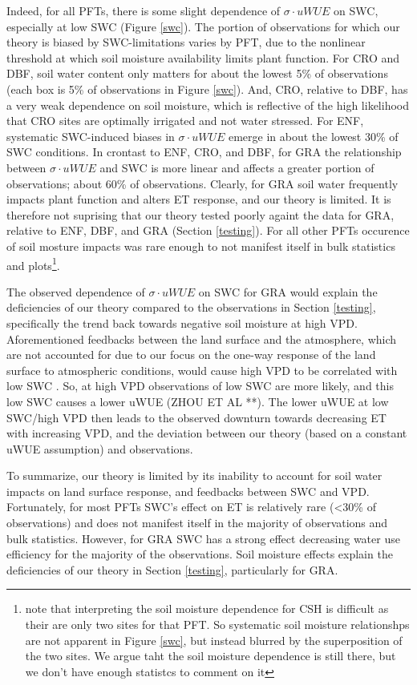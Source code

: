 \documentclass[draft,linenumbers]{agujournal}
\begin{document}
Indeed, for all PFTs, there is some slight dependence of $\sigma \cdot uWUE$ on SWC, especially at low SWC (Figure \ref{swc}). The portion of observations for which our theory is biased by SWC-limitations varies by PFT, due to the nonlinear threshold at which soil moisture availability limits plant function. For CRO and DBF, soil water content only matters for about the lowest 5\% of observations (each box is 5\% of observations in Figure \ref{swc}). And, CRO, relative to DBF, has a very weak dependence on soil moisture, which is reflective of the high likelihood that CRO sites are optimally irrigated and not water stressed. For ENF, systematic SWC-induced biases in $\sigma \cdot uWUE$ emerge in about the lowest 30\% of SWC conditions. In crontast to ENF, CRO, and DBF, for GRA the relationship between $\sigma \cdot uWUE$ and SWC is more linear and affects a greater portion of observations; about 60\% of observations. Clearly, for GRA soil water frequently impacts plant function and alters ET response, and our theory is limited. It is therefore not suprising that our theory tested poorly againt the data for GRA, relative to ENF, DBF, and GRA (Section \ref{testing}). For all other PFTs occurence of soil mosture impacts was rare enough to not manifest itself in bulk statistics and plots\footnote{note that interpreting the soil moisture dependence for CSH is difficult as their are only two sites for that PFT. So systematic soil moisture relationshps are not apparent in Figure \ref{swc}, but instead blurred by the superposition of the two sites. We argue taht the soil moisture dependence is still there, but we don't have enough statistcs to comment on it}.

The observed dependence of $\sigma \cdot uWUE$ on SWC for GRA would explain the deficiencies of our theory compared to the observations in Section \ref{testing}, specifically the trend back towards negative soil moisture at high VPD. Aforementioned feedbacks between the land surface and the atmosphere, which are not accounted for due to our focus on the one-way response of the land surface to atmospheric conditions, would cause high VPD to be correlated with low SWC \citep[][]{Getine_2016, Berg_2016}. So, at high VPD observations of low SWC are more likely, and this low SWC causes a lower uWUE (ZHOU ET AL **). The lower uWUE at low SWC/high VPD then leads to the observed downturn towards decreasing ET with increasing VPD, and the deviation between our theory (based on a constant uWUE assumption) and observations.

To summarize, our theory is limited by its inability to account for soil water impacts on land surface response, and feedbacks between SWC and VPD. Fortunately, for most PFTs SWC's effect on ET is relatively rare (<30\% of observations) and does not manifest itself in the majority of observations and bulk statistics. However, for GRA SWC has a strong effect decreasing water use efficiency for the majority of the observations. Soil moisture effects explain the deficiencies of our theory in Section \ref{testing}, particularly for GRA.
\end{document}
